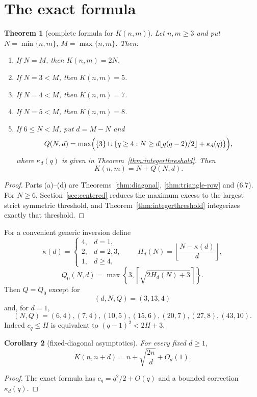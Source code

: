 \documentclass[11pt]{article}
\newtheorem{theorem}{Theorem}[section]
\newtheorem{corollary}[theorem]{Corollary}
\theoremstyle{remark}
\begin{document}
\section{The exact formula}\label{sec:mainformula}

\begin{theorem}[complete formula for $K(n,m)$]\label{thm:main}
Let $n,m\ge3$ and put $N=\min\{n,m\}$, $M=\max\{n,m\}$. Then:
\begin{enumerate}[label=(\alph*)]
\item If $N=M$, then $K(n,m)=2N$.
\item If $N=3<M$, then $K(n,m)=5$.
\item If $N=4<M$, then $K(n,m)=7$.
\item If $N=5<M$, then $K(n,m)=8$.
\item If $6\le N<M$, put $d=M-N$ and
\[
Q(N,d)=\max\Bigl(\{3\}\cup
\{q\ge4:N\ge d\lfloor q(q-2)/2\rfloor+\kappa_d(q)\}\Bigr),
\]
where $\kappa_d(q)$ is given in Theorem~\ref{thm:integerthreshold}. Then
\[
\boxed{K(n,m)=N+Q(N,d).}
\]
\end{enumerate}
\end{theorem}

\begin{proof}
Parts (a)--(d) are Theorems~\ref{thm:diagonal}, \ref{thm:triangle-row} and (6.7). For $N\ge6$, Section~\ref{sec:centered} reduces the maximum excess to the largest strict symmetric threshold, and Theorem~\ref{thm:integerthreshold} integerizes exactly that threshold.
\end{proof}

For a convenient generic inversion define
\[
\kappa(d)=
\begin{cases}
4,&d=1,\\
2,&d=2,3,\\
1,&d\ge4,
\end{cases}
\qquad
H_d(N)=\left\lfloor\frac{N-\kappa(d)}d\right\rfloor,
\]
\[
Q_0(N,d)=\max\left\{3,\left\lceil\sqrt{2H_d(N)+3}\right\rceil\right\}.
\]
Then $Q=Q_0$ except for
\[
(d,N,Q)=(3,13,4)
\]
and, for $d=1$,
\[
(N,Q)=(6,4),(7,4),(10,5),(15,6),(20,7),(27,8),(43,10).
\]
Indeed $c_q\le H$ is equivalent to $(q-1)^2<2H+3$.

\begin{corollary}[fixed-diagonal asymptotics]
For every fixed $d\ge1$,
\[
K(n,n+d)=n+\sqrt{\frac{2n}{d}}+O_d(1).
\]
\end{corollary}

\begin{proof}
The exact formula has $c_q=q^2/2+O(q)$ and a bounded correction $\kappa_d(q)$.
\end{proof}
\end{document}
